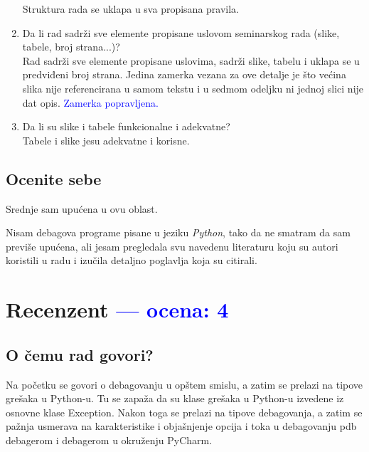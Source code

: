 \documentclass[a4paper]{report}
\newcommand{\odgovor}[1]{\textcolor{blue}{#1}}
\begin{document}
\begin{enumerate}
Struktura rada se uklapa u sva propisana pravila. 
\item Da li rad sadrži sve elemente propisane uslovom seminarskog rada (slike, tabele, broj strana...)?\\
Rad sadrži sve elemente propisane uslovima, sadrži slike, tabelu i uklapa se u predviđeni broj strana. Jedina zamerka vezana za ove detalje je što većina slika nije referencirana u samom tekstu i u sedmom odeljku ni jednoj slici nije dat opis.
\odgovor{Zamerka popravljena.}
\item Da li su slike i tabele funkcionalne i adekvatne?\\
Tabele i slike jesu adekvatne i korisne.
\end{enumerate}

\section{Ocenite sebe}
Srednje sam upućena u ovu oblast.

Nisam debagova programe pisane u jeziku \emph{Python}, tako da ne smatram da sam previše upućena, ali jesam pregledala svu navedenu literaturu koju su autori koristili u radu i izučila detaljno poglavlja koja su citirali.
\chapter{Recenzent \odgovor{--- ocena: 4} }


\section{O čemu rad govori?}
Na početku se govori o debagovanju u opštem smislu, a zatim se prelazi na tipove grešaka u Python-u. Tu se zapaža da su klase grešaka u Python-u izvedene iz osnovne klase Exception. Nakon toga se prelazi na tipove debagovanja, a zatim se pažnja usmerava na karakteristike i objašnjenje opcija i toka u debagovanju pdb debagerom i debagerom u okruženju PyCharm.
\end{document}

